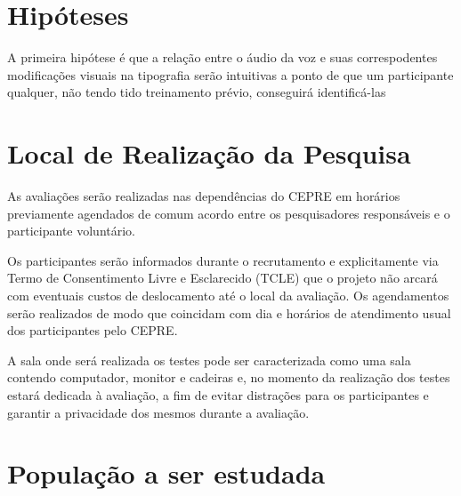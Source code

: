 \documentclass[a4paper,11pt,titlepage,singlespacing]{article}
\begin{document}
\section{Hipóteses}

A primeira hipótese é que a relação entre o áudio da voz e suas correspodentes modificações visuais na tipografia serão intuitivas a ponto de que um participante qualquer, não tendo tido treinamento prévio, conseguirá identificá-las   



\section{Local de Realização da Pesquisa}
As avaliações serão realizadas nas dependências do CEPRE em horários previamente agendados de comum acordo entre os pesquisadores responsáveis e o participante voluntário.

Os participantes serão informados durante o recrutamento e explicitamente via Termo de Consentimento Livre e Esclarecido (TCLE) que o projeto não arcará com eventuais custos de deslocamento até o local da avaliação. Os agendamentos serão realizados de modo que coincidam com dia e horários de atendimento usual dos participantes pelo CEPRE.

A sala onde será realizada os testes pode ser caracterizada como uma sala contendo computador, monitor e cadeiras e, no momento da realização dos testes estará dedicada à avaliação, a fim de evitar distrações para os participantes e garantir a privacidade dos mesmos durante a avaliação.

\section{População a ser estudada}
\end{document}
